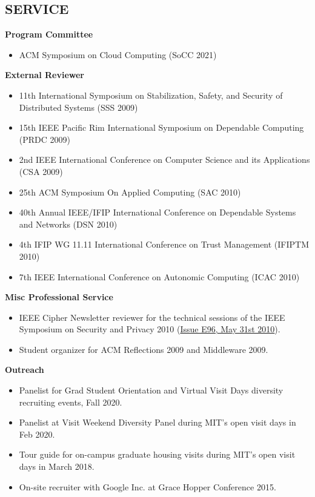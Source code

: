 \documentclass[line,margin]{res}
\begin{document}
\begin{resume}
\section{SERVICE}
  \textbf{Program Committee}
  \begin{itemize}  \itemsep -2pt
  \item ACM Symposium on Cloud Computing (SoCC 2021)
  \end{itemize}
  \textbf{External Reviewer}
  \begin{itemize}  \itemsep -2pt
  \item 11th International Symposium on Stabilization, Safety, and Security of Distributed Systems (SSS 2009)
  \item 15th IEEE Pacific Rim International Symposium on Dependable Computing (PRDC 2009)
  \item 2nd IEEE International Conference on Computer Science and its Applications (CSA 2009)
  \item 25th ACM Symposium On Applied Computing (SAC 2010)
  \item 40th Annual IEEE/IFIP International Conference on Dependable Systems and Networks (DSN 2010)
  \item 4th IFIP WG 11.11 International Conference on Trust Management (IFIPTM 2010)
  \item 7th IEEE International Conference on Autonomic Computing (ICAC 2010)
  \end{itemize}
  \textbf{Misc Professional Service}
  \begin{itemize}  \itemsep -2pt
  \item IEEE Cipher Newsletter reviewer for the technical sessions of the IEEE Symposium on Security and Privacy 2010 (\href{http://www.ieee-security.org/Cipher/PastIssues/2010/E96.May-2010/E96.May-2010.html}{Issue E96, May 31st 2010}).
  \item Student organizer for ACM Reflections 2009 and Middleware 2009.
  \end{itemize}
  \textbf{Outreach}
  \begin{itemize}  \itemsep -2pt
  \item Panelist for Grad Student Orientation and Virtual Visit Days diversity recruiting events, Fall 2020.
  \item Panelist at Visit Weekend Diversity Panel during MIT's open visit days in Feb 2020.
  \item Tour guide for on-campus graduate housing visits during MIT's open visit days in March 2018.
  \item On-site recruiter with Google Inc. at Grace Hopper Conference 2015.

\end{itemize}
\end{resume}
\end{document}
